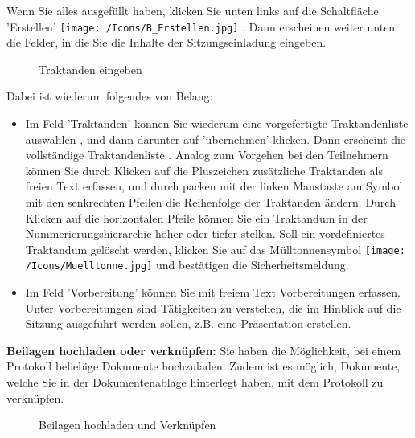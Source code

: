 Wenn Sie alles ausgefüllt haben, klicken Sie unten links auf die Schaltfläche 'Erstellen' \texttt{[image: /Icons/B\_Erstellen.jpg]} . Dann erscheinen weiter unten die Felder, in die Sie die Inhalte der Sitzungseinladung eingeben.

\begin{figure}[H]
\caption{Traktanden eingeben}
\end{figure}

Dabei ist wiederum folgendes von Belang:

\begin{itemize}
\item 
Im Feld 'Traktanden' können Sie wiederum eine vorgefertigte Traktandenliste auswählen , und dann darunter auf 'übernehmen'  klicken. Dann erscheint die vollständige Traktandenliste . Analog zum Vorgehen bei den Teilnehmern können Sie durch Klicken auf die Pluszeichen  zusätzliche Traktanden als freien Text erfassen, und durch packen mit der linken Maustaste am Symbol mit den senkrechten Pfeilen  die Reihenfolge der Traktanden ändern. Durch Klicken auf die horizontalen Pfeile  können Sie ein Traktandum in der Nummerierungshierarchie höher oder tiefer stellen. Soll ein vordefiniertes Traktandum gelöscht werden, klicken Sie auf das Mülltonnensymbol \texttt{[image: /Icons/Muelltonne.jpg]}  und bestätigen die Sicherheitsmeldung.
\item 
Im Feld 'Vorbereitung' können Sie mit freiem Text Vorbereitungen  erfassen. Unter Vorbereitungen sind Tätigkeiten zu verstehen, die im Hinblick auf die Sitzung ausgeführt werden sollen, z.B. eine Präsentation erstellen.
\end{itemize}

\textbf{Beilagen hochladen oder verknüpfen:}
Sie haben die Möglichkeit, bei einem Protokoll beliebige Dokumente hochzuladen. Zudem ist es möglich, Dokumente, welche Sie in der Dokumentenablage hinterlegt haben, mit dem Protokoll zu verknüpfen.  

\vspace{\baselineskip}

\begin{figure}[H]
\caption{Beilagen hochladen und Verknüpfen}
\end{figure}

